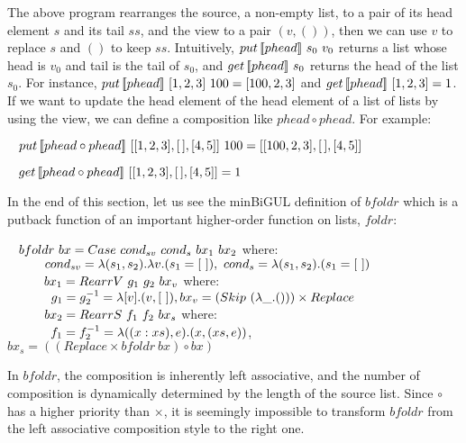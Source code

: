The above program rearranges the source, a non-empty list, to a pair of its head element $s$ and its tail $ss$, and the view to a pair $(v, ())$, then we can use $v$ to replace $s$ and $()$ to keep $ss$. Intuitively, $put \, [\![phead]\!] \ s_0 \ v_0$ returns a list whose head is $v_0$ and tail is the tail of $s_0$, and $get \, [\![phead]\!] \ s_0$ returns the head of the list $s_0$. For instance, $put \, [\![phead]\!] \ [1,2,3] \ 100 = [100,2,3]$ and $get \, [\![phead]\!] \ [1,2,3] = 1$. If we want to update the head element of the head element of a list of lists by using the view, we can define a composition like $phead \circ phead$. For example:

\smallvspace
$\hspace*{3mm} put \, [\![phead \circ phead]\!] \ [[1,2,3],[\,],[4,5]] \ 100 = [[100,2,3],[\,],[4,5]]$

$\hspace*{3mm} get \, [\![phead \circ phead]\!] \ [[1,2,3],[\,],[4,5]] = 1$
\smallvspace

In the end of this section, let us see the minBiGUL definition of $bfoldr$ which is a putback function of an important higher-order function on lists, $foldr$:

\smallvspace
$\tab bfoldr \ bx = Case \ cond_{sv} \ cond_s \ bx_1 \ bx_2$ where:\\
$\tabs{3} \ cond_{sv} = \lambda (s_1,s_2).\lambda v.(s_1 = [\ ]), \ cond_s = \lambda (s_1,s_2).(s_1 = [\ ])$\\
$\tabs{3} \ bx_1 = RearrV \ g_1 \ g_2 \ bx_v$ where: \\
    $\tabs{4} g_1 = g_2^{-1} = \lambda [v].(v,[\ ]), bx_v = (Skip \ (\lambda \_.())) \times Replace$\\
$\tabs{3} \ bx_2 = RearrS \ f_1 \ f_2 \ bx_s$ where:\\
    $\tabs{4} f_1 = f_2^{-1} = \lambda ((x:xs),e).(x,(xs,e))$, 
$bx_s = ((Replace \times bfoldr \ bx) \circ bx)$
\smallvspace

\noindent In $bfoldr$, the composition is inherently left associative, and the number of composition is dynamically determined by the length of the source list. Since $\circ$ has a higher priority than $\times$, it is seemingly impossible to transform $bfoldr$ from the left associative composition style to the right one. 

